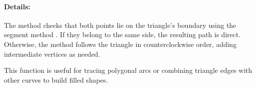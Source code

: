 \paragraph{Details:}
The method checks that both points lie on the triangle’s boundary using the segment method . If they belong to the same side, the resulting path is direct. Otherwise, the method follows the triangle in counterclockwise order, adding intermediate vertices as needed.

This function is useful for tracing polygonal arcs or combining triangle edges with other curves to build filled shapes.


\begin{center}
\end{center}
\endinput